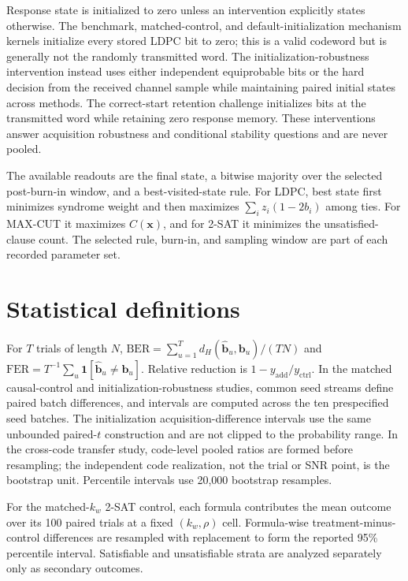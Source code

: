 \documentclass[aps,prapplied,reprint,superscriptaddress,longbibliography,floatfix]{revtex4-2}
\begin{document}
Response state is initialized to zero unless an intervention explicitly states otherwise.  The benchmark, matched-control, and default-initialization mechanism kernels initialize every stored LDPC bit to zero; this is a valid codeword but is generally not the randomly transmitted word.  The initialization-robustness intervention instead uses either independent equiprobable bits or the hard decision from the received channel sample while maintaining paired initial states across methods.  The correct-start retention challenge initializes bits at the transmitted word while retaining zero response memory.  These interventions answer acquisition robustness and conditional stability questions and are never pooled.

The available readouts are the final state, a bitwise majority over the selected post-burn-in window, and a best-visited-state rule.  For LDPC, best state first minimizes syndrome weight and then maximizes $\sum_i z_i(1-2b_i)$ among ties.  For MAX-CUT it maximizes $C(\bm x)$, and for 2-SAT it minimizes the unsatisfied-clause count.  The selected rule, burn-in, and sampling window are part of each recorded parameter set.

\section{Statistical definitions}
\label{app:statistics}

For $T$ trials of length $N$, $\mathrm{BER}=\sum_{u=1}^{T}d_H(\hat{\bm b}_u,\bm b_u)/(TN)$ and $\mathrm{FER}=T^{-1}\sum_u\mathbf{1}[\hat{\bm b}_u\neq\bm b_u]$.  Relative reduction is $1-y_{\mathrm{add}}/y_{\mathrm{ctrl}}$.  In the matched causal-control and initialization-robustness studies, common seed streams define paired batch differences, and intervals are computed across the ten prespecified seed batches.  The initialization acquisition-difference intervals use the same unbounded paired-$t$ construction and are not clipped to the probability range.  In the cross-code transfer study, code-level pooled ratios are formed before resampling; the independent code realization, not the trial or SNR point, is the bootstrap unit.  Percentile intervals use 20,000 bootstrap resamples.

For the matched-$k_w$ 2-SAT control, each formula contributes the mean outcome over its 100 paired trials at a fixed $(k_w,\rho)$ cell.  Formula-wise treatment-minus-control differences are resampled with replacement to form the reported 95\% percentile interval.  Satisfiable and unsatisfiable strata are analyzed separately only as secondary outcomes.
\end{document}

